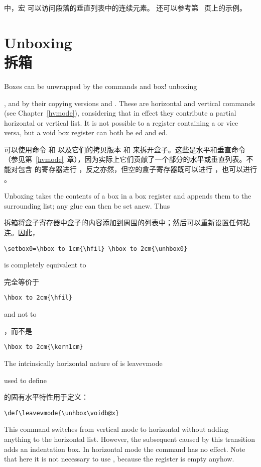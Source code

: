 中，宏  可以访问段落的垂直列表中的连续元素。
还可以参考第~\pageref{varioset} 页上的示例。


\section{Unboxing\\拆箱}

Boxes can be unwrapped by the commands  and
\term box! unboxing\par
{}, and by their copying versions 
 and . 
These are horizontal and vertical commands
(see Chapter~\ref{hvmode}), considering that in effect
they contribute a partial horizontal or vertical list.
It is not possible to  a register
containing a  or vice versa,
but a void box register can both be ed and
ed.

可以使用命令  和   以及它们的拷贝版本  和  来拆开盒子。这些是水平和垂直命令（参见第~\ref{hvmode}~章），因为实际上它们贡献了一个部分的水平或垂直列表。不能对包含  的寄存器进行 ，反之亦然，但空的盒子寄存器既可以进行 ，也可以进行 。
 
Unboxing takes the contents of a box in a box register and appends
them to the surrounding list; any glue can then 
be set anew. Thus

拆箱将盒子寄存器中盒子的内容添加到周围的列表中；然后可以重新设置任何粘连。因此，
\begin{verbatim}
\setbox0=\hbox to 1cm{\hfil} \hbox to 2cm{\unhbox0}
\end{verbatim}
is completely equivalent to 

完全等价于
\begin{verbatim}
\hbox to 2cm{\hfil}
\end{verbatim}
and not to

，而不是
\begin{verbatim}
\hbox to 2cm{\kern1cm}
\end{verbatim}
\awp

The intrinsically horizontal nature of  is
\cstoidx leavevmode\par
used to define

 的固有水平特性用于定义：
\begin{verbatim}
\def\leavevmode{\unhbox\voidb@x}
\end{verbatim}
This command switches from vertical mode to horizontal without
adding anything to the horizontal list. 
However, the subsequent  caused by this transition
adds an indentation box.
In horizontal mode the  command has no effect.
Note that here it is not necessary to use ,
because the register is empty anyhow. 

